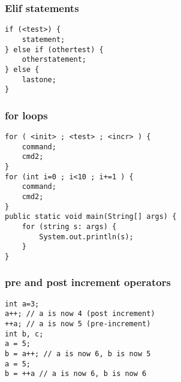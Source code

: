 \documentclass[a4paper,11pt]{article}
\theoremstyle{mytheor}
\begin{document}
\subsubsection*{Elif statements}
\begin{lstlisting}
if (<test>) {
    statement;
} else if (othertest) {
    otherstatement;
} else {
    lastone;
}
\end{lstlisting}

\subsubsection*{for loops}
\begin{lstlisting}
for ( <init> ; <test> ; <incr> ) {
    command;
    cmd2;
}
for (int i=0 ; i<10 ; i+=1 ) {
    command;
    cmd2;
}
public static void main(String[] args) {
    for (string s: args) {
        System.out.println(s);
    }
}
\end{lstlisting}
\subsubsection*{pre and post increment operators}
\begin{lstlisting}
int a=3;
a++; // a is now 4 (post increment)
++a; // a is now 5 (pre-increment)
int b, c;
a = 5;
b = a++; // a is now 6, b is now 5
a = 5;
b = ++a // a is now 6, b is now 6

\end{lstlisting}






\clearpage
\end{document}
